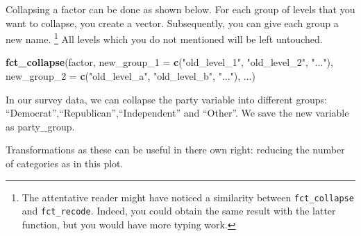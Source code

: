 \documentclass[]{tufte-book}
\newenvironment{Shaded}{}{}
\newcommand{\KeywordTok}[1]{\textcolor[rgb]{0.00,0.44,0.13}{\textbf{#1}}}
\newcommand{\DataTypeTok}[1]{\textcolor[rgb]{0.56,0.13,0.00}{#1}}
\newcommand{\StringTok}[1]{\textcolor[rgb]{0.25,0.44,0.63}{#1}}
\newcommand{\OperatorTok}[1]{\textcolor[rgb]{0.40,0.40,0.40}{#1}}
\newcommand{\NormalTok}[1]{#1}
\begin{document}
Collapsing a factor can be done as shown below. For each group of levels
that you want to collapse, you create a vector. Subsequently, you can
give each group a new name. \footnote{The attentative reader might have
  noticed a similarity between \texttt{fct\_collapse} and
  \texttt{fct\_recode}. Indeed, you could obtain the same result with
  the latter function, but you would have more typing work.} All levels
which you do not mentioned will be left untouched.

\begin{Shaded}
\begin{Highlighting}[]
\KeywordTok{fct_collapse}\NormalTok{(factor, }\DataTypeTok{new_group_1 =} \KeywordTok{c}\NormalTok{(}\StringTok{"old_level_1"}\NormalTok{, }
    \StringTok{"old_level_2"}\NormalTok{, }\StringTok{"..."}\NormalTok{), }\DataTypeTok{new_group_2 =} \KeywordTok{c}\NormalTok{(}\StringTok{"old_level_a"}\NormalTok{, }
    \StringTok{"old_level_b"}\NormalTok{, }\StringTok{"..."}\NormalTok{), ...)}
\end{Highlighting}
\end{Shaded}

In our survey data, we can collapse the party variable into different
groups: ``Democrat'',``Republican'',``Independent'' and ``Other''. We
save the new variable as party\_group.

\begin{Shaded}
\end{Shaded}

Transformations as these can be useful in there own right: reducing the
number of categories as in this plot.
\end{document}
